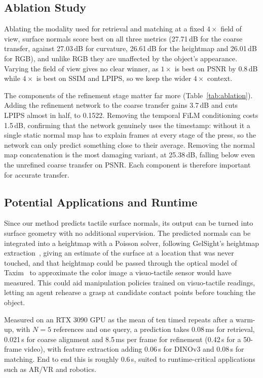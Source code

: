 \subsection{Ablation Study}



Ablating the modality used for retrieval and matching at a fixed $4\times$ field of view, surface
normals score best on all three metrics (27.71\,dB for the coarse transfer, against 27.03\,dB for
curvature, 26.61\,dB for the heightmap and 26.01\,dB for RGB), and unlike RGB they are unaffected by
the object's appearance. Varying the field of view gives no clear winner, as $1\times$ is best on
PSNR by 0.8\,dB while $4\times$ is best on SSIM and LPIPS, so we keep the wider $4\times$ context.

The components of the refinement stage matter far more (Table~\ref{tab:ablation}). Adding
the refinement network to the coarse transfer gains 3.7\,dB and cuts LPIPS almost in half, to
0.1522. Removing the temporal FiLM conditioning costs 1.5\,dB, confirming that the network
genuinely uses the timestamp: without it a single static normal map has to explain frames at every
stage of the press, so the network can only predict something close to their average. Removing the
normal map concatenation is the most damaging variant, at 25.38\,dB, falling below even the
unrefined coarse transfer on PSNR. Each component is therefore important for accurate transfer.

\subsection{Potential Applications and Runtime}

Since our method predicts tactile surface normals, its output can be turned into surface geometry
with no additional supervision. The predicted normals can be integrated into a heightmap with a
Poisson solver, following GelSight's heightmap extraction~\cite{gelsight}, giving an estimate of
the surface at a location that was never touched, and that heightmap could be passed through the
optical model of Taxim~\cite{taxim} to approximate the color image a visuo-tactile sensor would
have measured. This could aid manipulation
policies trained on visuo-tactile readings, letting an agent rehearse a grasp at candidate contact
points before touching the object.

Measured on an RTX 3090 GPU as the mean of ten timed repeats after a warm-up, with $N=5$ references
and one query, a prediction takes 0.08\,ms for retrieval, 0.021\,s for coarse alignment and
8.5\,ms per frame for refinement (0.42\,s for a 50-frame video), with feature extraction adding
0.06\,s for DINOv3 and 0.08\,s for matching. End to end this is roughly 0.6\,s, suited to
runtime-critical applications such as AR/VR and robotics.

